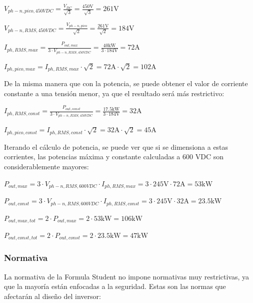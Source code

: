 \(V_{ph-n, pico, 450 VDC} = \frac{V_{DC}}{\sqrt{3}} = \frac{450 \text{V}}{\sqrt{3}} = 261 \text{V}\)

\(V_{ph-n, RMS, 450 VDC} = \frac{V_{ph-n, pico}}{\sqrt{2}} = \frac{261 \text{V}}{\sqrt{2}} = 184 \text{V}\)


\(I_{ph, RMS, max} = \frac{P_{out, max}}{3\cdot V_{ph-n, RMS, 450 VDC}} = \frac{40 \text{kW}}{3\cdot184 \text{V}} = 72 \text{A}\)

\(I_{ph, pico, max} = I_{ph, RMS, max}\cdot\sqrt{2} = 72\text{A} \cdot\sqrt{2} = 102 \text{A}\)

De la misma manera que con la potencia, se puede obtener el valor de corriente constante a una tensión menor, ya que el resultado será más restrictivo:

\(I_{ph, RMS, const} = \frac{P_{out, const}}{3\cdot V_{ph-n, RMS, 450 VDC}} = \frac{17.5 \text{kW}}{3\cdot184 \text{V}} = 32 \text{A}\)

\(I_{ph, pico, const} = I_{ph, RMS, const}\cdot\sqrt{2} = 32 \text{A}\cdot\sqrt{2} = 45 \text{A}\)


Iterando el cálculo de potencia, se puede ver que si se dimensiona a estas corrientes, las potencias máxima y constante calculadas a 600 VDC son considerablemente mayores:

\(P_{out, max} = 3\cdot V_{ph-n, RMS, 600 VDC}\cdot I_{ph, RMS, max} = 3\cdot245 \text{V}\cdot 72 \text{A} = 53 \text{kW}\)

\(P_{out, const} = 3\cdot V_{ph-n, RMS, 600 VDC}\cdot I_{ph, RMS, const} = 3\cdot245 \text{V}\cdot 32 \text{A} = 23.5 \text{kW}\)

\(P_{out, max, tot} = 2\cdot P_{out, max} = 2\cdot53 \text{kW} = 106 \text{kW}\)

\(P_{out, const, tot} = 2\cdot P_{out, const} = 2\cdot23.5 \text{kW} = 47 \text{kW}\)

\subsubsection{Normativa}
La normativa de la Formula Student no impone normativas muy restrictivas, ya que la mayoría están enfocadas a la seguridad. Estas son las normas que afectarán al diseño del inversor:

